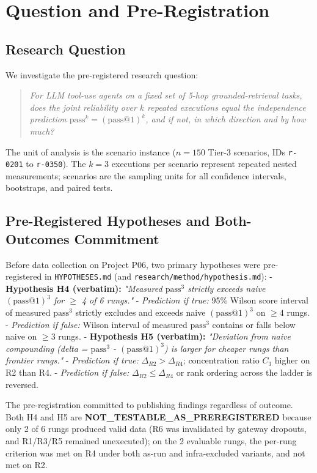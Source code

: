 \documentclass[11pt,letterpaper]{article}
\begin{document}
\section{Question and Pre-Registration}

\subsection{Research Question}
We investigate the pre-registered research question:
\begin{quote}
\emph{For LLM tool-use agents on a fixed set of 5-hop grounded-retrieval tasks, does the joint reliability over $k$ repeated executions equal the independence prediction $\text{pass}^k = (\text{pass@1})^k$, and if not, in which direction and by how much?}
\end{quote}

The unit of analysis is the scenario instance ($n=150$ Tier-3 scenarios, IDs \texttt{r-0201} to \texttt{r-0350}). The $k=3$ executions per scenario represent repeated nested measurements; scenarios are the sampling units for all confidence intervals, bootstraps, and paired tests.

\subsection{Pre-Registered Hypotheses and Both-Outcomes Commitment}
Before data collection on Project P06, two primary hypotheses were pre-registered in \texttt{HYPOTHESES.md} (and \texttt{research/method/hypothesis.md}):
- \textbf{Hypothesis H4 (verbatim):} \emph{"Measured $\text{pass}^{3}$ strictly exceeds naive $(\text{pass@1})^{3}$ for $\ge$ 4 of 6 rungs."}  
  - \emph{Prediction if true:} 95\% Wilson score interval of measured $\text{pass}^3$ strictly excludes and exceeds naive $(\text{pass@1})^3$ on $\ge 4$ rungs.
  - \emph{Prediction if false:} Wilson interval of measured $\text{pass}^3$ contains or falls below naive on $\ge 3$ rungs.
- \textbf{Hypothesis H5 (verbatim):} \emph{"Deviation from naive compounding (delta = $\text{pass}^{3}$ - $(\text{pass@1})^{3}$) is larger for cheaper rungs than frontier rungs."}  
  - \emph{Prediction if true:} $\Delta_{R2} > \Delta_{R4}$; concentration ratio $C_3$ higher on R2 than R4.
  - \emph{Prediction if false:} $\Delta_{R2} \le \Delta_{R4}$ or rank ordering across the ladder is reversed.

The pre-registration committed to publishing findings regardless of outcome. Both H4 and H5 are \textbf{NOT\_TESTABLE\_AS\_PREREGISTERED} because only 2 of 6 rungs produced valid data (R6 was invalidated by gateway dropouts, and R1/R3/R5 remained unexecuted); on the 2 evaluable rungs, the per-rung criterion was met on R4 under both as-run and infra-excluded variants, and not met on R2.
\end{document}
